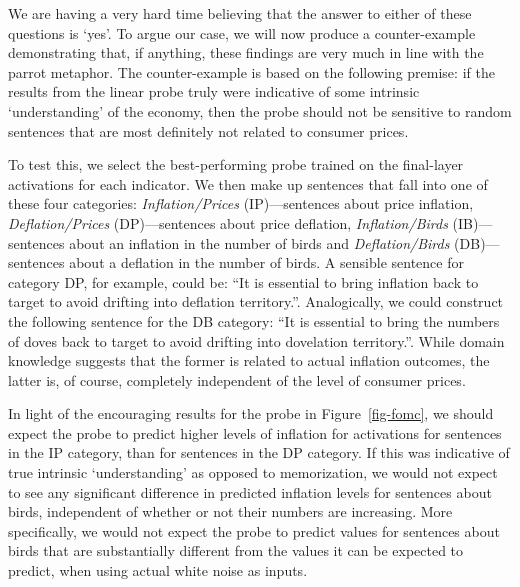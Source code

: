 \documentclass{article}
\theoremstyle{plain}
\theoremstyle{definition}
\theoremstyle{remark}
\begin{document}

We are having a very hard time believing that the answer to either of these questions is `yes'. To argue our case, we will now produce a counter-example demonstrating that, if anything, these findings are very much in line with the parrot metaphor. The counter-example is based on the following premise: if the results from the linear probe truly were indicative of some intrinsic `understanding' of the economy, then the probe should not be sensitive to random sentences that are most definitely not related to consumer prices.

To test this, we select the best-performing probe trained on the final-layer activations for each indicator. We then make up sentences that fall into one of these four categories: \emph{Inflation/Prices} (IP)---sentences about price inflation, \emph{Deflation/Prices} (DP)---sentences about price deflation, \emph{Inflation/Birds} (IB)---sentences about an inflation in the number of birds and \emph{Deflation/Birds} (DB)---sentences about a deflation in the number of birds. A sensible sentence for category DP, for example, could be: ``It is essential to bring inflation back to target to avoid drifting into deflation territory.''. Analogically, we could construct the following sentence for the DB category: ``It is essential to bring the numbers of doves back to target to avoid drifting into dovelation territory.''. While domain knowledge suggests that the former is related to actual inflation outcomes, the latter is, of course, completely independent of the level of consumer prices.


In light of the encouraging results for the probe in Figure~\ref{fig-fomc}, we should expect the probe to predict higher levels of inflation for activations for sentences in the IP category, than for sentences in the DP category. If this was indicative of true intrinsic `understanding' as opposed to memorization, we would not expect to see any significant difference in predicted inflation levels for sentences about birds, independent of whether or not their numbers are increasing. More specifically, we would not expect the probe to predict values for sentences about birds that are substantially different from the values it can be expected to predict, when using actual white noise as inputs.
\end{document}
